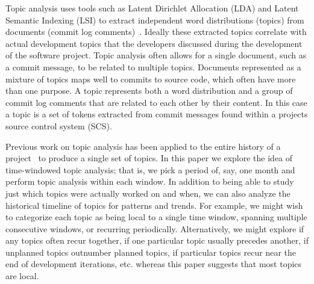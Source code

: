 \documentclass[times, 10pt,twocolumn]{article}
\begin{document}



Topic analysis 
uses tools such as Latent Dirichlet Allocation (LDA) and Latent Semantic Indexing (LSI) to extract
independent word distributions (topics) from
documents (commit log comments)~\cite{1374321,10.1109/ICPC.2007.13,lukins2008,10.1109/MSR.2007.20}.
Ideally these extracted topics 
correlate with actual development topics that the developers discussed
during the development of the software project. 
Topic analysis often allows for a single document, such as a commit
message, to be related to multiple topics. Documents represented as a mixture of topics maps well to commits
to source code, which often have more than one purpose.  A topic
represents both a word distribution and a group of commit log comments
that are related to each other by their content.  In this case a topic
is a set of tokens extracted from commit messages found within a
projects source control system (SCS). 


Previous work on topic analysis has been applied to the entire history of a 
project~\cite{1321709,lukins2008,10.1109/ICPC.2007.13}
to produce a single set of topics. In this paper we explore the idea
of time-windowed topic analysis; that is, we pick a period of, say,
one month and perform topic analysis within each window.  In addition
to being able to study just which topics were actually worked on and
when, we can also analyze the historical timeline of topics for
patterns and trends.  For example, we might wish to categorize each
topic as being local to a single time window, spanning multiple
consecutive windows, or recurring periodically.  Alternatively, we
might explore if any topics often recur together, if one particular
topic usually precedes another, if unplanned topics outnumber planned
topics, if particular topics recur near the end of development
iterations, etc.  whereas this paper suggests that most topics are
local.

\end{document}
